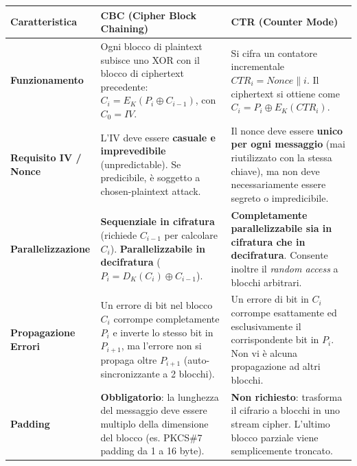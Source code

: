 \documentclass[11pt,a4paper]{article}
\begin{document}
\begin{solutionbox}
\begin{center}
\small
\begin{tabularx}{\textwidth}{lXX}
\toprule
\textbf{Caratteristica} & \textbf{CBC (Cipher Block Chaining)} & \textbf{CTR (Counter Mode)} \\
\midrule
\textbf{Funzionamento} & Ogni blocco di plaintext subisce uno XOR con il blocco di ciphertext precedente: $C_i = E_K(P_i \oplus C_{i-1})$, con $C_0 = IV$. & Si cifra un contatore incrementale $CTR_i = Nonce \parallel i$. Il ciphertext si ottiene come $C_i = P_i \oplus E_K(CTR_i)$. \\
\textbf{Requisito IV / Nonce} & L'IV deve essere \textbf{casuale e imprevedibile} (unpredictable). Se predicibile, \`e soggetto a chosen-plaintext attack. & Il nonce deve essere \textbf{unico per ogni messaggio} (mai riutilizzato con la stessa chiave), ma non deve necessariamente essere segreto o impredicibile. \\
\textbf{Parallelizzazione} & \textbf{Sequenziale in cifratura} (richiede $C_{i-1}$ per calcolare $C_i$). \textbf{Parallelizzabile in decifratura} ($P_i = D_K(C_i) \oplus C_{i-1}$). & \textbf{Completamente parallelizzabile sia in cifratura che in decifratura}. Consente inoltre il \textit{random access} a blocchi arbitrari. \\
\textbf{Propagazione Errori} & Un errore di bit nel blocco $C_i$ corrompe completamente $P_i$ e inverte lo stesso bit in $P_{i+1}$, ma l'errore non si propaga oltre $P_{i+1}$ (auto-sincronizzante a 2 blocchi). & Un errore di bit in $C_i$ corrompe esattamente ed esclusivamente il corrispondente bit in $P_i$. Non vi \`e alcuna propagazione ad altri blocchi. \\
\textbf{Padding} & \textbf{Obbligatorio}: la lunghezza del messaggio deve essere multiplo della dimensione del blocco (es. PKCS\#7 padding da 1 a 16 byte). & \textbf{Non richiesto}: trasforma il cifrario a blocchi in uno stream cipher. L'ultimo blocco parziale viene semplicemente troncato. \\
\bottomrule
\end{tabularx}
\end{center}
\end{solutionbox}
\end{document}
